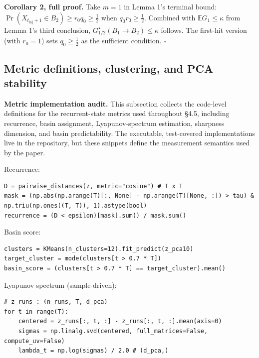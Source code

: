 \documentclass{article}
\newenvironment{codeblock}[1][]{%
  \par\addvspace{2pt}%
  \ifstrempty{#1}{}{\noindent\textit{\small #1}\par\nobreak\addvspace{2pt}}%
  \begingroup\footnotesize\begin{mdframed}[style=codestyle]%
}{%
  \end{mdframed}\endgroup\par%
}
\theoremstyle{plain}
\theoremstyle{definition}
\begin{document}
\textbf{Corollary 2, full proof.} Take $m = 1$ in Lemma 1's terminal
bound: $\Pr(X_{t_{\mathrm{inj}}+1} \in B_2) \ge r_0 q_0 \ge
\tfrac{1}{2}$ when $q_0 r_0 \ge \tfrac{1}{2}$. Combined with
$\mathbb{E} G_1 \le \kappa$ from Lemma 1's third conclusion,
$G^\star_{1/2}(B_1 \to B_2) \le \kappa$ follows. The first-hit
version (with $r_0 = 1$) sets $q_0 \ge \tfrac{1}{2}$ as the
sufficient condition. $\square$

\subsection{Metric definitions, clustering, and PCA stability}

\textbf{Metric implementation audit.} This subsection collects the code-level definitions for the recurrent-state metrics used throughout §4.5, including recurrence, basin assignment, Lyapunov-spectrum estimation, sharpness dimension, and basin predictability. The executable, test-covered implementations live in the repository, but these snippets define the measurement semantics used by the paper.

Recurrence:

\begin{codeblock}
\begin{verbatim}
D = pairwise_distances(z, metric="cosine") # T x T
mask = (np.abs(np.arange(T)[:, None] - np.arange(T)[None, :]) > tau) & np.triu(np.ones((T, T)), 1).astype(bool)
recurrence = (D < epsilon)[mask].sum() / mask.sum()
\end{verbatim}
\end{codeblock}

Basin score:

\begin{codeblock}
\begin{verbatim}
clusters = KMeans(n_clusters=12).fit_predict(z_pca10)
target_cluster = mode(clusters[t > 0.7 * T])
basin_score = (clusters[t > 0.7 * T] == target_cluster).mean()
\end{verbatim}
\end{codeblock}

Lyapunov spectrum (sample-driven):

\begin{codeblock}
\begin{verbatim}
# z_runs : (n_runs, T, d_pca)
for t in range(T):
    centered = z_runs[:, t, :] - z_runs[:, t, :].mean(axis=0)
    sigmas = np.linalg.svd(centered, full_matrices=False, compute_uv=False)
    lambda_t = np.log(sigmas) / 2.0 # (d_pca,)
\end{verbatim}
\end{codeblock}
\end{document}
